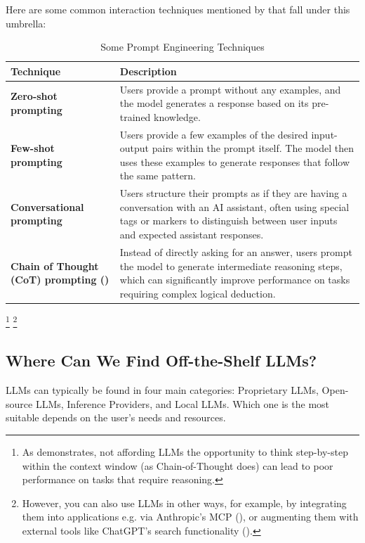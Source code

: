 \documentclass{article} %
\begin{document}
Here are some common interaction techniques mentioned by \cite{Karpathy-2025}
that fall under this umbrella:
\begin{table}[h!]
\centering
\begin{tabular}{p{}p{}}
\toprule
\textbf{Technique} & \textbf{Description} \\
\midrule
\textbf{Zero-shot prompting} & Users provide a prompt without any examples,
    and the model generates a response based on its pre-trained knowledge. \\
\addlinespace
\textbf{Few-shot prompting} & Users provide a few examples of the desired input-output pairs within the prompt itself.
The model then uses these examples to generate responses that follow the same pattern. \\
\addlinespace
\textbf{Conversational prompting} & Users structure their prompts as if they are having a conversation with an AI assistant,
often using special tags or markers to distinguish between user inputs and expected assistant responses. \\
\addlinespace
\textbf{Chain of Thought (CoT) prompting (\cite{Wei-et-al-2023})} & Instead of directly asking for an answer, users prompt the model \newline 
to generate intermediate reasoning steps, which can significantly \newline 
improve performance on tasks requiring complex logical deduction. 
\\
\bottomrule
\end{tabular}
\caption{Some Prompt Engineering Techniques}
\label{tab:pe_tech}
\end{table}
\footnote{
    As \cite{Karpathy-2025} demonstrates, not affording LLMs the opportunity to think step-by-step
    within the context window (as Chain-of-Thought does) can lead to poor performance on tasks that require reasoning.
}
\footnote{
    However, you can also use LLMs in other ways, for example,
    by integrating them into applications e.g. via Anthropic's MCP (\cite{Anthropic-2025}),
    or augmenting them with external tools like ChatGPT's search functionality (\cite{ChatGPT-2022}).
}

\subsection{Where Can We Find Off-the-Shelf LLMs?}

LLMs can typically be found in four main categories: Proprietary LLMs, Open-source LLMs, Inference Providers, and Local LLMs.
Which one is the most suitable depends on the user's needs and resources.
\end{document}
